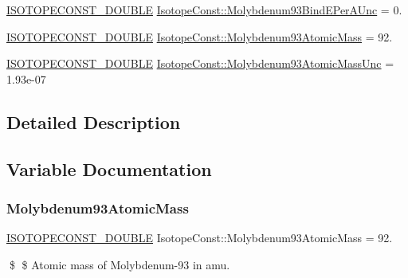 \begin{DoxyCompactItemize}
\mbox{\hyperlink{group___isotope_const-_macros_ga8f45a7272ce02c0b4c65c44636ed719a}{I\+S\+O\+T\+O\+P\+E\+C\+O\+N\+S\+T\+\_\+\+D\+O\+U\+B\+LE}} \mbox{\hyperlink{group___isotope_const-_molybdenum-_mo93_gab9d381fa342064afd0888bb6e24da509}{Isotope\+Const\+::\+Molybdenum93\+Bind\+E\+Per\+A\+Unc}} = 0.
\item 
\mbox{\hyperlink{group___isotope_const-_macros_ga8f45a7272ce02c0b4c65c44636ed719a}{I\+S\+O\+T\+O\+P\+E\+C\+O\+N\+S\+T\+\_\+\+D\+O\+U\+B\+LE}} \mbox{\hyperlink{group___isotope_const-_molybdenum-_mo93_ga5a8619aa4fda558e68ca2b7764867c4a}{Isotope\+Const\+::\+Molybdenum93\+Atomic\+Mass}} = 92.
\item 
\mbox{\hyperlink{group___isotope_const-_macros_ga8f45a7272ce02c0b4c65c44636ed719a}{I\+S\+O\+T\+O\+P\+E\+C\+O\+N\+S\+T\+\_\+\+D\+O\+U\+B\+LE}} \mbox{\hyperlink{group___isotope_const-_molybdenum-_mo93_gabb8eb067034b372587384eef3683e105}{Isotope\+Const\+::\+Molybdenum93\+Atomic\+Mass\+Unc}} = 1.\+93e-\/07
\end{DoxyCompactItemize}


\subsection{Detailed Description}


\subsection{Variable Documentation}
\mbox{\label{group___isotope_const-_molybdenum-_mo93_ga5a8619aa4fda558e68ca2b7764867c4a}} 
\subsubsection{\texorpdfstring{Molybdenum93\+Atomic\+Mass}{Molybdenum93AtomicMass}}
{\footnotesize\ttfamily \mbox{\hyperlink{group___isotope_const-_macros_ga8f45a7272ce02c0b4c65c44636ed719a}{I\+S\+O\+T\+O\+P\+E\+C\+O\+N\+S\+T\+\_\+\+D\+O\+U\+B\+LE}} Isotope\+Const\+::\+Molybdenum93\+Atomic\+Mass = 92.}

\$ \$ Atomic mass of Molybdenum-\/93 in amu. \mbox{\label{group___isotope_const-_molybdenum-_mo93_gabb8eb067034b372587384eef3683e105}} 
